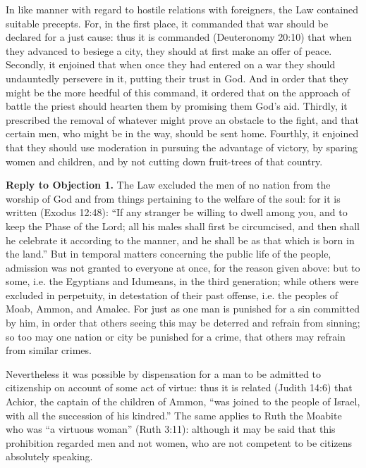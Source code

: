 In like manner with regard to hostile relations with foreigners, the Law contained suitable precepts. For, in the first place, it commanded that war should be declared for a just cause: thus it is commanded (Deuteronomy 20:10) that when they advanced to besiege a city, they should at first make an offer of peace. Secondly, it enjoined that when once they had entered on a war they should undauntedly persevere in it, putting their trust in God. And in order that they might be the more heedful of this command, it ordered that on the approach of battle the priest should hearten them by promising them God's aid. Thirdly, it prescribed the removal of whatever might prove an obstacle to the fight, and that certain men, who might be in the way, should be sent home. Fourthly, it enjoined that they should use moderation in pursuing the advantage of victory, by sparing women and children, and by not cutting down fruit-trees of that country.

\textbf{Reply to Objection 1.} The Law excluded the men of no nation from the worship of God and from things pertaining to the welfare of the soul: for it is written (Exodus 12:48): ``If any stranger be willing to dwell among you, and to keep the Phase of the Lord; all his males shall first be circumcised, and then shall he celebrate it according to the manner, and he shall be as that which is born in the land.'' But in temporal matters concerning the public life of the people, admission was not granted to everyone at once, for the reason given above: but to some, i.e. the Egyptians and Idumeans, in the third generation; while others were excluded in perpetuity, in detestation of their past offense, i.e. the peoples of Moab, Ammon, and Amalec. For just as one man is punished for a sin committed by him, in order that others seeing this may be deterred and refrain from sinning; so too may one nation or city be punished for a crime, that others may refrain from similar crimes.

Nevertheless it was possible by dispensation for a man to be admitted to citizenship on account of some act of virtue: thus it is related (Judith 14:6) that Achior, the captain of the children of Ammon, ``was joined to the people of Israel, with all the succession of his kindred.'' The same applies to Ruth the Moabite who was ``a virtuous woman'' (Ruth 3:11): although it may be said that this prohibition regarded men and not women, who are not competent to be citizens absolutely speaking.

